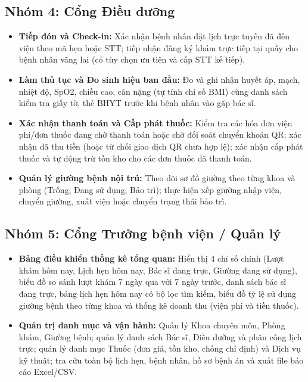 \documentclass[12pt,a4paper]{report}
\begin{document}
\subsection{Nhóm 4: Cổng Điều dưỡng}
\begin{itemize}
  \item \textbf{Tiếp đón và Check-in:} Xác nhận bệnh nhân đặt lịch trực tuyến đã đến viện theo mã hẹn hoặc STT; tiếp nhận đăng ký khám trực tiếp tại quầy cho bệnh nhân vãng lai (có tùy chọn ưu tiên và cấp STT kế tiếp).
  \item \textbf{Làm thủ tục và Đo sinh hiệu ban đầu:} Đo và ghi nhận huyết áp, mạch, nhiệt độ, SpO2, chiều cao, cân nặng (tự tính chỉ số BMI) cùng danh sách kiểm tra giấy tờ, thẻ BHYT trước khi bệnh nhân vào gặp bác sĩ.
  \item \textbf{Xác nhận thanh toán và Cấp phát thuốc:} Kiểm tra các hóa đơn viện phí/đơn thuốc đang chờ thanh toán hoặc chờ đối soát chuyển khoản QR; xác nhận đã thu tiền (hoặc từ chối giao dịch QR chưa hợp lệ); xác nhận cấp phát thuốc và tự động trừ tồn kho cho các đơn thuốc đã thanh toán.
  \item \textbf{Quản lý giường bệnh nội trú:} Theo dõi sơ đồ giường theo từng khoa và phòng (Trống, Đang sử dụng, Bảo trì); thực hiện xếp giường nhập viện, chuyển giường, xuất viện hoặc chuyển trạng thái bảo trì.
\end{itemize}

\subsection{Nhóm 5: Cổng Trưởng bệnh viện / Quản lý}
\begin{itemize}
  \item \textbf{Bảng điều khiển thống kê tổng quan:} Hiển thị 4 chỉ số chính (Lượt khám hôm nay, Lịch hẹn hôm nay, Bác sĩ đang trực, Giường đang sử dụng), biểu đồ so sánh lượt khám 7 ngày qua với 7 ngày trước, danh sách bác sĩ đang trực, bảng lịch hẹn hôm nay có bộ lọc tìm kiếm, biểu đồ tỷ lệ sử dụng giường bệnh theo từng khoa và thống kê doanh thu (viện phí và tiền thuốc).
  \item \textbf{Quản trị danh mục và vận hành:} Quản lý Khoa chuyên môn, Phòng khám, Giường bệnh; quản lý danh sách Bác sĩ, Điều dưỡng và phân công lịch trực; quản lý danh mục Thuốc (đơn giá, tồn kho, chống chỉ định) và Dịch vụ kỹ thuật; tra cứu toàn bộ lịch hẹn, bệnh nhân, hồ sơ bệnh án và xuất file báo cáo Excel/CSV.
\end{itemize}
\end{document}
